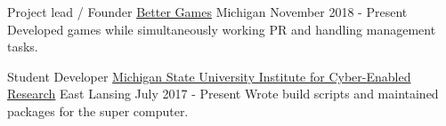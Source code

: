 
\begin{cventries}
    \cventry
        {Project lead / Founder} %
        {\href{https://www.better-games.org}{Better Games}} %
        {Michigan} %
        {November 2018 - Present} %
        {
            {Developed games while simultaneously working PR and handling management tasks.}
        }

    \cventry
        {Student Developer}
        {\href{https://icer.msu.edu/}{Michigan State University Institute for Cyber-Enabled Research}}
        {East Lansing}
        {July 2017 - Present}
        {
            {Wrote build scripts and maintained packages for the super computer.}
        }
\end{cventries}
